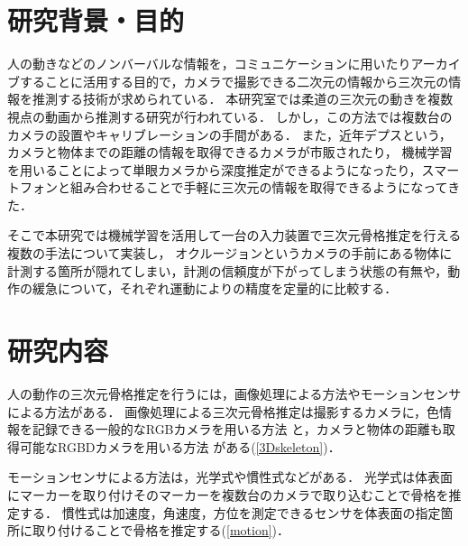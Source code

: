 \documentclass[titlepage]{jarticle}
\begin{document}
\maketitle

\section{研究背景・目的}
人の動きなどのノンバーバルな情報を，コミュニケーションに用いたりアーカイブすることに活用する目的で，カメラで撮影できる二次元の情報から三次元の情報を推測する技術が求められている．
本研究室では柔道の三次元の動きを複数視点の動画から推測する研究\cite{turugi}が行われている．
しかし，この方法では複数台のカメラの設置やキャリブレーションの手間がある．
また，近年デプスという，カメラと物体までの距離の情報を取得できるカメラが市販されたり，
機械学習を用いることによって単眼カメラから深度推定ができるようになったり，スマートフォンと組み合わせることで手軽に三次元の情報を取得できるようになってきた．

そこで本研究では機械学習を活用して一台の入力装置で三次元骨格推定を行える複数の手法について実装し，
オクルージョンというカメラの手前にある物体に計測する箇所が隠れてしまい，計測の信頼度が下がってしまう状態の有無や，動作の緩急について，それぞれ運動によりの精度を定量的に比較する．
\section{研究内容}
%
人の動作の三次元骨格推定を行うには，画像処理による方法やモーションセンサによる方法がある．%
画像処理による三次元骨格推定は撮影するカメラに，色情報を記録できる一般的なRGBカメラを用いる方法
と，カメラと物体の距離も取得可能なRGBDカメラを用いる方法
がある(\ref{3Dskeleton})．

モーションセンサによる方法は，光学式や慣性式などがある．
光学式は体表面にマーカーを取り付けそのマーカーを複数台のカメラで取り込むことで骨格を推定する．
慣性式は加速度，角速度，方位を測定できるセンサを体表面の指定箇所に取り付けることで骨格を推定する(\ref{motion})．

\end{document}

